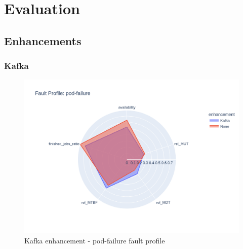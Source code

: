 \chapter{Evaluation}


\section{Enhancements}

\subsection{Kafka}

\begin{figure}[h]
	\centering
	\includegraphics[width=140mm, keepaspectratio]{figures/kafka_with_base_pod-failure.png}
	\caption{Kafka enhancement - pod-failure fault profile}
	\label{fig:kafka-results-pod-failure}
\end{figure}

